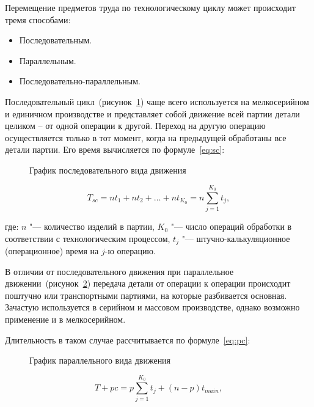 Перемещение предметов труда по технологическому циклу может происходит тремя способами:

\begin{itemize}
 	\item Последовательным.
	\item Параллельным.
    \item Последовательно-параллельным.
\end{itemize}

Последовательный цикл~(рисунок~\cref{fig:seq}) чаще всего используется на мелкосерийном и единичном производстве и представляет собой движение всей партии детали целиком -- от одной операции к другой. Переход на другую операцию осуществляется только в тот момент, когда на предыдущей обработаны все детали партии.
Его время вычисляется по формуле~\cref{eq:sc}:

\begin{figure}[!htb]
	\caption{График последовательного вида движения}\label{fig:seq}
\end{figure}

\begin{equation}
T_{sc} = n t_{1} + n t_{2} + \ldots + n t_{K_0} = n \sum_{j=1}^{K_{0}}t_{j},
\label{eq:sc}
\end{equation}


\noindent где: $n$ "--- количество изделий в партии, $K_{0}$ "--- число операций обработки в соответствии с технологическим процессом,  $t_{j}$ "--- штучно-калькуляционное (операционное) время на $j$-ю операцию.

В отличии от последовательного движения при параллельное движении~(рисунок~\cref{fig:parallel}) передача детали от операции к операции происходит поштучно или транспортными партиями, на которые разбивается основная. Зачастую используется в серийном и массовом производстве, однако возможно применение и в мелкосерийном.

Длительность в таком случае рассчитывается по формуле~\cref{eq:pc}:

\begin{figure}[!htb]
	\caption{График параллельного вида движения}\label{fig:parallel}
\end{figure}

\begin{equation}
T+{pc} = p\sum_{j=1}^{K_{0}}t_{j}+(n-p)t_{main},
\label{eq:pc}
\end{equation}

